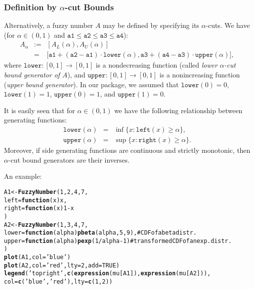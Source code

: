 \documentclass[11pt]{article}\usepackage{graphicx, color}
\makeatletter
\newcommand{\hlfunctioncall}[1]{\textcolor[rgb]{0.501960784313725,0,0.329411764705882}{\textbf{#1}}}%
\newcommand{\hlstring}[1]{\textcolor[rgb]{0.6,0.6,1}{#1}}%
\newcommand{\hlcomment}[1]{\textcolor[rgb]{0.180392156862745,0.6,0.341176470588235}{#1}}%
\newenvironment{kframe}{%
 \def\at@end@of@kframe{}%
 \ifinner\ifhmode%
  \def\at@end@of@kframe{\end{minipage}}%
  \begin{minipage}{\columnwidth}%
 \fi\fi%
 \def\FrameCommand##1{\hskip\@totalleftmargin \hskip-\fboxsep
 \colorbox{shadecolor}{##1}\hskip-\fboxsep
     \hskip-\linewidth \hskip-\@totalleftmargin \hskip\columnwidth}%
 \MakeFramed {\advance\hsize-\width
   \@totalleftmargin\z@ \linewidth\hsize
   \@setminipage}}%
 {\par\unskip\endMakeFramed%
 \at@end@of@kframe}
\newenvironment{knitrout}{}{} %
\makeatother
\begin{document}
\subsubsection{Definition by $\alpha$-cut Bounds}

Alternatively, a fuzzy number $A$ may be defined by specifying 
its $\alpha$-cuts. We have (for $\alpha\in(0,1)$ and 
$\mathtt{a1}\le\mathtt{a2}\le\mathtt{a3}\le\mathtt{a4}$):
\begin{eqnarray}
A_\alpha & := & [A_L(\alpha), A_U(\alpha)]\\
 & = & \big[
   \mathtt{a1}+(\mathtt{a2}-\mathtt{a1})\cdot\mathtt{lower}(\alpha),
   \mathtt{a3}+(\mathtt{a4}-\mathtt{a3})\cdot\mathtt{upper}(\alpha)
\big],
\end{eqnarray}
where $\mathtt{lower}: [0,1]\to[0,1]$ is a nondecreasing function
(called \textit{lower $\alpha$-cut bound generator of $A$}),
and $\mathtt{upper}: [0,1]\to[0,1]$ is a nonincreasing function
(\textit{upper bound generator}).
In our package, we assumed that
$\mathtt{lower}(0)=0$, $\mathtt{lower}(1)=1$,
$\mathtt{upper}(0)=1$, and $\mathtt{upper}(1)=0$.

It is easily seen that for $\alpha\in(0,1)$ we have the following
relationship between generating functions:
\begin{eqnarray}
\mathtt{lower}(\alpha) & = & \inf\{x: \mathtt{left}(x)\ge\alpha\}, \\
\mathtt{upper}(\alpha) & = & \sup\{x: \mathtt{right}(x)\ge\alpha\}.
\end{eqnarray}
Moreover, if side generating functions are continuous and strictly
monotonic, then $\alpha$-cut bound generators are their inverses.

\bigskip\noindent
An example:

\begin{knitrout}\small
{}\color{fgcolor}\begin{kframe}
\begin{alltt}
A1 <- \hlfunctioncall{FuzzyNumber}(1, 2, 4, 7,
    left=\hlfunctioncall{function}(x) x,
   right=\hlfunctioncall{function}(x) 1-x
)
A2 <- \hlfunctioncall{FuzzyNumber}(1, 3, 4, 7,
   lower=\hlfunctioncall{function}(alpha) \hlfunctioncall{pbeta}(alpha, 5, 9), \hlcomment{# CDF of a beta distr.}
   upper=\hlfunctioncall{function}(alpha) \hlfunctioncall{pexp}(1/alpha-1) \hlcomment{# transformed CDF of an exp. distr.}
)
\hlfunctioncall{plot}(A1, col=\hlstring{'blue'})
\hlfunctioncall{plot}(A2, col=\hlstring{'red'}, lty=2, add=TRUE)
\hlfunctioncall{legend}(\hlstring{'topright'}, \hlfunctioncall{c}(\hlfunctioncall{expression}(mu[A1]), \hlfunctioncall{expression}(mu[A2])),
   col=\hlfunctioncall{c}(\hlstring{'blue'}, \hlstring{'red'}), lty=\hlfunctioncall{c}(1,2))
\end{alltt}
\end{kframe}
\end{knitrout}
\end{document}
